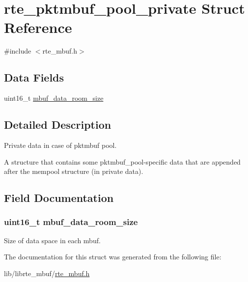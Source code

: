\hypertarget{structrte__pktmbuf__pool__private}{}\section{rte\+\_\+pktmbuf\+\_\+pool\+\_\+private Struct Reference}
\label{structrte__pktmbuf__pool__private}


{\ttfamily \#include $<$rte\+\_\+mbuf.\+h$>$}

\subsection*{Data Fields}
\begin{DoxyCompactItemize}
\item 
uint16\+\_\+t \hyperlink{structrte__pktmbuf__pool__private_a02268238edfea11cb3db0022d35da517}{mbuf\+\_\+data\+\_\+room\+\_\+size}
\end{DoxyCompactItemize}


\subsection{Detailed Description}
Private data in case of pktmbuf pool.

A structure that contains some pktmbuf\+\_\+pool-\/specific data that are appended after the mempool structure (in private data). 

\subsection{Field Documentation}
\hypertarget{structrte__pktmbuf__pool__private_a02268238edfea11cb3db0022d35da517}{}
\subsubsection[{mbuf\+\_\+data\+\_\+room\+\_\+size}]{\setlength{\rightskip}{0pt plus 5cm}uint16\+\_\+t mbuf\+\_\+data\+\_\+room\+\_\+size}\label{structrte__pktmbuf__pool__private_a02268238edfea11cb3db0022d35da517}
Size of data space in each mbuf. 

The documentation for this struct was generated from the following file\+:\begin{DoxyCompactItemize}
\item 
lib/librte\+\_\+mbuf/\hyperlink{rte__mbuf_8h}{rte\+\_\+mbuf.\+h}\end{DoxyCompactItemize}
